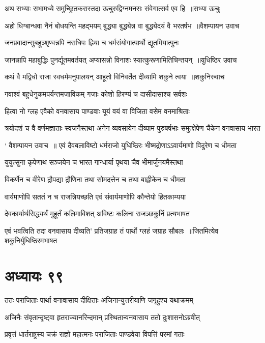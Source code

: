 \threelineshloka
{अथ सभ्याः सभामध्ये समुच्छ्रितकरास्तदा}
{ऊचुरुद्विग्नमनसः संवेगात्सर्व एव हि ॥सभ्या ऊचुः}
{}


\twolineshloka
{अहो धिग्बान्धवा नैनं बोधयन्ति महद्भयम्}
{बुद्ध्या बुद्ध्येन्न वा बुद्ध्येदयं वै भरतर्षभ ॥वैशम्पायन उवाच}


\twolineshloka
{जनप्रवादान्सुबहूञ्शृण्वन्नपि नराधिपः}
{ह्रिया च धर्मसंयोगात्पार्थो द्यूतमियात्पुनः}


\twolineshloka
{जानन्नापि महाबुद्धिः पुनर्द्यूतमवर्तयत्}
{अप्यासन्नो विनाशः स्यात्कुरूणामितिचिन्तयन् ॥युधिष्ठिर उवाच}


\twolineshloka
{कथं वै मद्विधो राजा स्वधर्ममनुपालयन्}
{आहूतो विनिवर्तेत दीव्यामि शकुने त्वया ॥शकुनिरुवाच}


\twolineshloka
{गवाश्वं बहुधेनुकमपर्यन्तमजाविकम्}
{गजाः कोशो हिरण्यं च दासीदासाश्च सर्वशः}


\twolineshloka
{हित्वा नो ग्लह एवैको वनवासाय पाण्डवाः}
{यूयं वयं वा विजिता वसेम वनमाश्रिताः}


\threelineshloka
{त्रयोदशं च वै वर्णमज्ञाताः स्वजनैस्तथा}
{अनेन व्यवसायेन दीव्याम पुरुषर्षभाः}
{समुत्क्षेपेण चैकेन वनवासाय भारत}


\twolineshloka
{` वैशम्पायन उवाच ॥ एवं दैवबलाविष्टो धर्मराजो युधिष्ठिरः}
{भीष्मद्रोणाऽऽवार्यमाणो विदुरेण च धीमता}


\twolineshloka
{युयुत्सुना कृपेणाथ सञ्जयेन च भारत}
{गान्धार्या पृथया चैव भीमार्जुनयमैस्तथा}


\twolineshloka
{विकर्णेन च वीरेण द्रौपद्या द्रौणिना तथा}
{सोमदत्तेन च तथा बाह्लीकेन च धीमता}


\twolineshloka
{वार्यमाणोपि सततं न च राजन्नियच्छति}
{एवं संवार्यमाणोपि कौन्तेयो हितकाम्यया}


\twolineshloka
{देवकार्यार्थसिद्ध्यर्थं मुहूर्तं कलिमाविशत्}
{अविष्टः कलिना राजञ्छकुनिं प्रत्यभाषत}


\twolineshloka
{एवं भवत्विति तदा वनवासाय दीव्यति'}
{प्रतिजग्राह तं पार्थो ग्लहं जग्राह सौबलः ॥जितमित्येव शकुनिर्युधिष्ठिरमभाषत}


\chapter{अध्यायः ९९}
\twolineshloka
{ततः पराजिताः पार्था वनावासाय दीक्षिताः}
{अजिनान्युत्तरीयाणि जगृहुश्च यथाक्रमम्}


\twolineshloka
{अजिनैः संवृतान्दृष्ट्वा हृतराज्यानरिन्दमान्}
{प्रस्थितान्वनवासाय ततो दुःशासनोऽब्रवीत्}


\twolineshloka
{प्रवृत्तं धार्तराष्ट्रस्य चक्रं राज्ञो महात्मनः}
{पराजिताः पाण्डवेया विपत्तिं परमां गताः}


